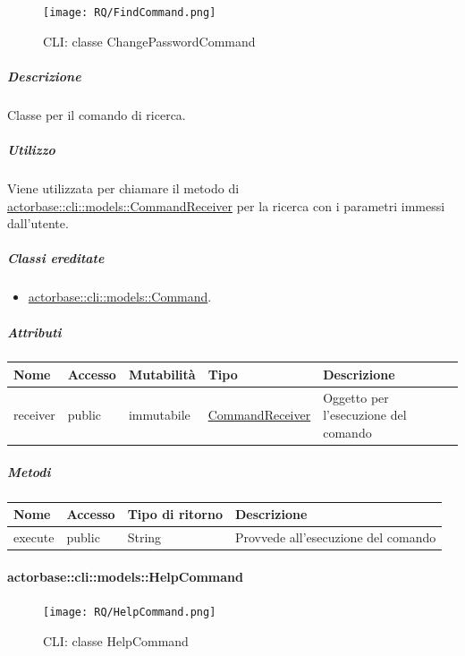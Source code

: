 \documentclass{scalatekids-article}
\begin{document}
\begin{figure}[H]
  \begin{center}
    \texttt{[image: RQ/FindCommand.png]}
    \caption{CLI: classe ChangePasswordCommand}
  \end{center}
\end{figure}

\subparagraph{Descrizione}

Classe per il comando di ricerca.

\subparagraph{Utilizzo}

Viene utilizzata per chiamare il metodo di
\hyperref[sec:actorbase::cli::models::CommandReceiver]{actorbase::cli::models::CommandReceiver} per la ricerca con i parametri immessi
dall'utente.

\subparagraph{Classi ereditate}

\begin{itemize}
\item \hyperref[sec:actorbase::cli::models::Command]{actorbase::cli::models::Command}.
\end{itemize}

\subparagraph{Attributi}

\begin{tabular}{| p{1cm} | p{1.5cm} | p{2cm} | p{4cm} | p{8.5cm} |}
  \hline
  Nome & Accesso & Mutabilità & Tipo & Descrizione\\
  \hline
  receiver & public & immutabile & \hyperref[sec:actorbase::cli::models::CommandReceiver]{CommandReceiver} & Oggetto per l'esecuzione del comando \\
  \hline
\end{tabular}

\subparagraph{Metodi}

\begin{tabular}{| l | l | l | l |}
  \hline
  Nome & Accesso & Tipo di ritorno & Descrizione\\
  \hline
  execute & public & String & Provvede all'esecuzione del comando\\
  \hline
\end{tabular}


\paragraph{actorbase::cli::models::HelpCommand}
\label{sec:actorbase::cli::models::HelpCommand}

\begin{figure}[H]
  \begin{center}
    \texttt{[image: RQ/HelpCommand.png]}
    \caption{CLI: classe HelpCommand}
  \end{center}
\end{figure}
\end{document}
